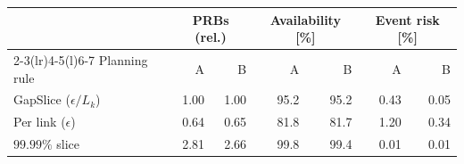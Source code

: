 \begin{tabular}{@{}l r r r r r r@{}}
\toprule
 & \multicolumn{2}{c}{PRBs (rel.)} & \multicolumn{2}{c}{Availability [\%]} & \multicolumn{2}{c}{Event risk [\%]}\\
\cmidrule(lr){2-3}\cmidrule(lr){4-5}\cmidrule(l){6-7}
Planning rule & A & B & A & B & A & B\\
\midrule
GapSlice ($\epsilon/L_k$) & 1.00 & 1.00 & 95.2 & 95.2 & 0.43 & 0.05\\
Per link ($\epsilon$) & 0.64 & 0.65 & 81.8 & 81.7 & 1.20 & 0.34\\
$99.99\%$ slice & 2.81 & 2.66 & 99.8 & 99.4 & 0.01 & 0.01\\
\bottomrule
\end{tabular}

